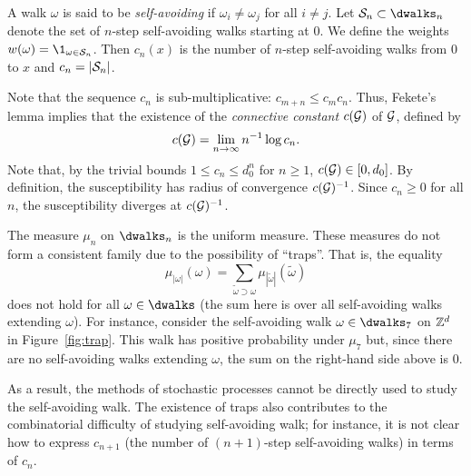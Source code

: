 \begin{example}
A walk $\omega$ is said to be \emph{self-avoiding} if $\omega_i \ne \omega_j$
for all $i \ne j$. Let $\Scal_n \subset \dwalks_n$ denote the set of $n$-step
self-avoiding walks starting at $0$. We define the weights $w(\omega) = \1_{\omega\in\Scal_n}$.
Then $c_n(x)$ is the number of $n$-step self-avoiding walks from $0$ to $x$
and $c_n = |\mathcal{S}_n|$.

Note that the sequence $c_n$ is sub-multiplicative: $c_{m+n} \le c_m c_n$.
Thus, Fekete's lemma implies that the existence of the \emph{connective constant}
$c(\mathcal{G})$ of $\mathcal{G}$, defined by
\begin{equation}
c(\mathcal{G}) = \lim_{n\rightarrow\infty} n^{-1} \log c_n.
\end{equation}
Note that, by the trivial bounds $1 \le c_n \le d_0^n$ for $n \ge 1$, $c(\mathcal{G}) \in [0, d_0]$.
By definition, the susceptibility has radius of convergence $c(\mathcal{G})^{-1}$.
Since $c_n \ge 0$ for all $n$, the susceptibility diverges at $c(\mathcal{G})^{-1}$.

The measure $\mu_n$ on $\dwalks_n$ is the uniform measure.
These measures do not form a consistent family due to the possibility of ``traps''. That is, the equality
\begin{equation}
\mu_{|\omega|}(\omega) = \sum_{\tilde\omega \supset \omega} \mu_{|\tilde\omega|}(\tilde\omega)
\end{equation}
does not hold for all $\omega\in\dwalks$ (the sum here is over all self-avoiding walks extending $\omega$).
For instance, consider the self-avoiding walk $\omega\in\dwalks_7$ on ${ {{\mathbb Z}}^d }$ in
Figure~\ref{fig:trap}. This walk has positive probability under $\mu_7$ but,
since there are no self-avoiding walks extending $\omega$, the sum on the 
right-hand side above is $0$.

As a result, the methods of stochastic processes cannot be directly used to
study the self-avoiding walk. The existence of traps also contributes to the
combinatorial difficulty of studying self-avoiding walk; for instance, it is
not clear how to express $c_{n+1}$ (the number of $(n+1)$-step self-avoiding walks)
in terms of $c_n$.

\end{example}

